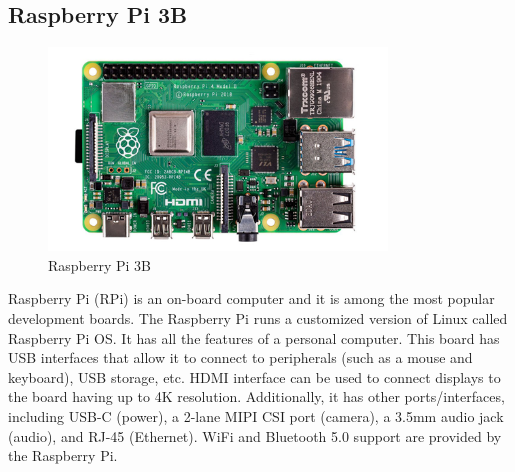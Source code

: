 \subsection{Raspberry Pi 3B}

\begin{figure}[h!]
\centering
\includegraphics[width=9cm]{./Figures/Rpi_3B.png}
\caption{Raspberry Pi 3B}
\label{Rpi_3B}
\end{figure}

\par Raspberry Pi (RPi) is an on-board computer and it is among the most popular development boards. The Raspberry Pi runs a customized version of Linux called Raspberry Pi OS. It has all the features of a personal computer. This board has USB interfaces that allow it to connect to peripherals (such as a mouse and keyboard), USB storage, etc. HDMI interface can be used to connect displays to the board having up to 4K resolution. Additionally, it has other ports/interfaces, including USB-C (power), a 2-lane MIPI CSI port (camera), a 3.5mm audio jack (audio), and RJ-45 (Ethernet). WiFi and Bluetooth 5.0 support are provided by the Raspberry Pi.

